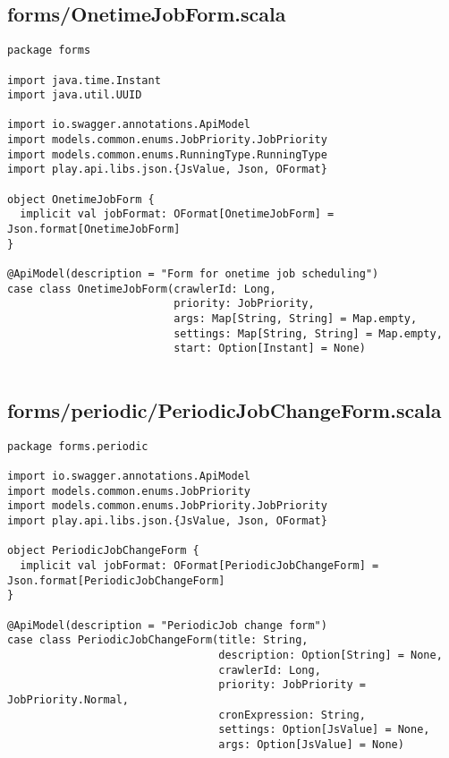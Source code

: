 \subsection{forms/OnetimeJobForm.scala}
\begin{lstlisting}
package forms

import java.time.Instant
import java.util.UUID

import io.swagger.annotations.ApiModel
import models.common.enums.JobPriority.JobPriority
import models.common.enums.RunningType.RunningType
import play.api.libs.json.{JsValue, Json, OFormat}

object OnetimeJobForm {
  implicit val jobFormat: OFormat[OnetimeJobForm] = Json.format[OnetimeJobForm]
}

@ApiModel(description = "Form for onetime job scheduling")
case class OnetimeJobForm(crawlerId: Long,
                          priority: JobPriority,
                          args: Map[String, String] = Map.empty,
                          settings: Map[String, String] = Map.empty,
                          start: Option[Instant] = None)


\end{lstlisting}
\subsection{forms/periodic/PeriodicJobChangeForm.scala}
\begin{lstlisting}
package forms.periodic

import io.swagger.annotations.ApiModel
import models.common.enums.JobPriority
import models.common.enums.JobPriority.JobPriority
import play.api.libs.json.{JsValue, Json, OFormat}

object PeriodicJobChangeForm {
  implicit val jobFormat: OFormat[PeriodicJobChangeForm] = Json.format[PeriodicJobChangeForm]
}

@ApiModel(description = "PeriodicJob change form")
case class PeriodicJobChangeForm(title: String,
                                 description: Option[String] = None,
                                 crawlerId: Long,
                                 priority: JobPriority = JobPriority.Normal,
                                 cronExpression: String,
                                 settings: Option[JsValue] = None,
                                 args: Option[JsValue] = None)\end{lstlisting}
